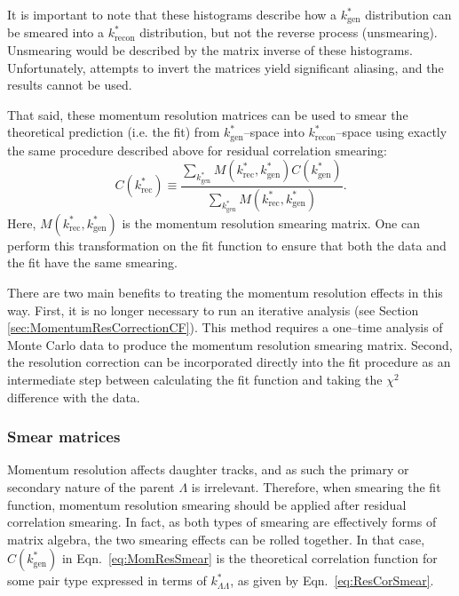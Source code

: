 It is important to note that these histograms describe how a $k^*_\mathrm{gen}$ distribution can be smeared into a $k^*_\mathrm{recon}$ distribution, but not the reverse process (unsmearing).
Unsmearing would be described by the matrix inverse of these histograms.
Unfortunately, attempts to invert the matrices yield significant aliasing, and the results cannot be used.

That said, these momentum resolution matrices can be used to smear the theoretical prediction (i.e. the fit) from $k^*_\mathrm{gen}$--space into $k^*_\mathrm{recon}$--space using exactly the same procedure described above for residual correlation smearing:
\begin{equation}
\label{eq:MomResSmear}
C(k^*_{\mathrm{rec}}) \equiv \frac{\displaystyle\sum\limits_{k^*_{\mathrm{gen}}}M(k^*_{\mathrm{rec}},k^*_{\mathrm{gen}})C(k^*_{\mathrm{gen}})}{\displaystyle\sum\limits_{k^*_{\mathrm{gen}}}M(k^*_{\mathrm{rec}},k^*_{\mathrm{gen}})}.
\end{equation} 
Here, $M(k^*_{\mathrm{rec}},k^*_{\mathrm{gen}})$ is the momentum resolution smearing matrix.
One can perform this transformation on the fit function to ensure that both the data and the fit have the same smearing. 

There are two main benefits to treating the momentum resolution effects in this way. 
First, it is no longer necessary to run an iterative analysis (see Section \ref{sec:MomentumResCorrectionCF}). 
This method requires a one--time analysis of Monte Carlo data to produce the momentum resolution smearing matrix. 
Second, the resolution correction can be incorporated directly into the fit procedure as an intermediate step between calculating the fit function and taking the $\chi^2$ difference with the data.

\subsubsection{Smear matrices}
\label{sec:SmearMath}
Momentum resolution affects daughter tracks, and as such the primary or secondary nature of the parent $\Lambda$ is irrelevant.
Therefore, when smearing the fit function, momentum resolution smearing should be applied after residual correlation smearing. 
In fact, as both types of smearing are effectively forms of matrix algebra, the two smearing effects can be rolled together. 
In that case, $C(k^*_\mathrm{gen})$ in Eqn.\ \ref{eq:MomResSmear} is the theoretical correlation function for some pair type expressed in terms of $k^*_{\Lambda\Lambda}$, as given by Eqn.\ \ref{eq:ResCorSmear}.


